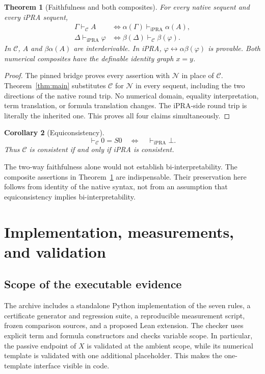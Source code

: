 \documentclass[11pt]{article}
\newtheorem{theorem}{Theorem}[section]
\newtheorem{corollary}[theorem]{Corollary}
\theoremstyle{definition}\newtheorem{definition}[theorem]{Definition}
\theoremstyle{remark}\newtheorem{remark}[theorem]{Remark}
\newcommand{\C}{\mathcal C}
\newcommand{\N}{\mathcal N}
\newcommand{\iPRA}{\mathrm{iPRA}}
\begin{document}
\begin{theorem}[Faithfulness and both composites]\label{thm:bi}
For every native sequent and every iPRA sequent,
\begin{align*}
 \Gamma\vdash_{\C}A
  &\Longleftrightarrow\alpha(\Gamma)\vdash_{\iPRA}\alpha(A),\\
 \Delta\vdash_{\iPRA}\varphi
  &\Longleftrightarrow\beta(\Delta)\vdash_{\C}\beta(\varphi).
\end{align*}
In $\C$, $A$ and $\beta\alpha(A)$ are interderivable. In iPRA,
$\varphi\leftrightarrow\alpha\beta(\varphi)$ is provable.
Both numerical composites have the definable identity graph $x=y$.
\end{theorem}
\begin{proof}
The pinned bridge proves every assertion with $\N$ in place of $\C$.
Theorem~\ref{thm:main} substitutes $\C$ for $\N$ in every sequent,
including the two directions of the native round trip. No numerical
domain, equality interpretation, term translation, or formula
translation changes. The iPRA-side round trip is literally the inherited
one. This proves all four claims simultaneously.
\end{proof}

\begin{corollary}[Equiconsistency]
\[
 \vdash_{\C}0=S0\quad\Longleftrightarrow\quad
 \vdash_{\iPRA}\bot.
\]
Thus $\C$ is consistent if and only if iPRA is consistent.
\end{corollary}

The two-way faithfulness alone would not establish bi-interpretability.
The composite assertions in Theorem~\ref{thm:bi} are indispensable.
Their preservation here follows from identity of the native syntax,
not from an assumption that equiconsistency implies bi-interpretability.

\section{Implementation, measurements, and validation}

\subsection{Scope of the executable evidence}

The archive includes a standalone Python implementation of the seven
rules, a certificate generator and regression suite, a reproducible
measurement script, frozen comparison sources, and a proposed Lean
extension. The checker uses explicit term and formula constructors and
checks variable scope. In particular, the passive endpoint of $X$ is
validated at the ambient scope, while its numerical template is
validated with one additional placeholder. This makes the one-template
interface visible in code.
\end{document}
